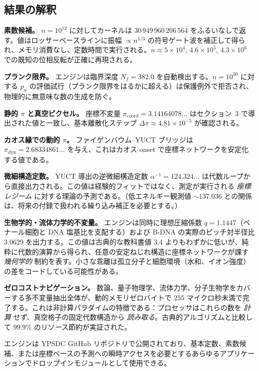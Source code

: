 \documentclass[12pt,a4paper]{article}
\begin{document}
	\subsection{結果の解釈}
	
	\textbf{素数候補。} $n=10^{12}$ に対してカーネルは $30\,949\,960\,206\,564$ をふるいなしで返す。値はロッサーベースラインに振幅 $\propto n^{1/3}$ の符号ゲート波を補正して得られ、メモリ消費なし、定数時間で実行される。$n\approx 5\times10^4$, $4.6\times10^5$, $4.3\times10^6$ での既知の位相反転が正確に再現される。
	
	\textbf{プランク限界。} エンジンは臨界深度 $N_f=382.0$ を自動検出する。$n=10^{30}$ に対する $p_n$ の評価試行（プランク限界をはるかに超える）は保護例外で拒否され、物理的に無意味な数の生成を防ぐ。
	
	\textbf{静的 $\pi$ と真空ピクセル。} 座標不変量 $\pi_{\mathrm{coord}} = 3.14164078\ldots$ はセクション~3 で導出された値と一致し、基本離散化ステップ $\Delta\pi \approx 4.81\times10^{-5}$ が確認される。
	
	\textbf{カオス縁での動的 $\pi$。} ファイゲンバウム–YUCT ブリッジは $\pi_{\mathrm{dyn}} = 2.68334861\ldots$ を与え、これはカオス onset で座標ネットワークを安定化する値である。
	
	\textbf{微細構造定数。} YUCT 導出の逆微細構造定数 $\alpha^{-1} = 124.324\ldots$ は代数ループから直接出力される。この値は経験的フィットではなく、測定が実行される \emph{座標レジーム} に対する理論の予測である。（低エネルギー観測値 $\sim 137.036$ との関係は、将来の付録で扱われる繰り込み補正を必要とする。）
	
	\textbf{生物学的・流体力学的不変量。} エンジンは同時に理想圧縮係数 $q = 1.1447$（ベナール細胞と DNA 塩基比を支配する）および B-DNA の実際のピッチ対半径比 $3.0629$ を出力する。この値は古典的な教科書値 3.4 よりもわずかに低いが、純粋に代数的演算から得られ、任意の安定ねじれ構造に座標ネットワークが課す \emph{幾何学的} 制約を表す。小さな乖離は孤立分子と細胞環境（水和、イオン強度）の差をコードしている可能性がある。
	
	\textbf{ゼロコストナビゲーション。} 数論、量子物理学、流体力学、分子生物学をカバーする多不変量抽出全体が、動的メモリゼロバイトで $255$ マイクロ秒未満で完了する。これは非計算パラダイムの特徴である：プロセッサはこれらの数を \emph{計算} せず、真空格子の固定代数構造から \emph{読み取る}。古典的アルゴリズムと比較して $99.9\%$ のリソース節約が実証された。
	
	エンジンは YPSDC GitHub リポジトリで公開されており、基本定数、素数候補、または座標ベースの予測への瞬時アクセスを必要とするあらゆるアプリケーションでドロップインモジュールとして使用できる。
	
\end{document}
